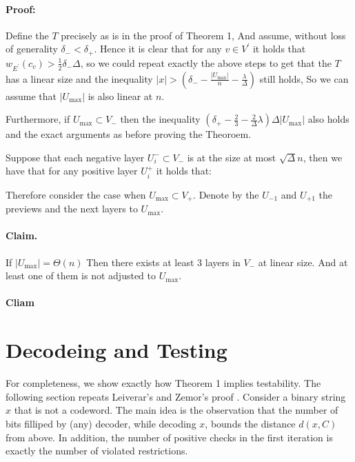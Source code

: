 \documentclass{article}
\begin{document}
\begin{multicols*}{2}
  \paragraph{Proof:} Define the $T$ precisely as is in the proof of Theorem 1, And assume, without loss of generality $\delta_{-} < \delta_{+}$. Hence it is clear that for any $v \in V^\prime$ it holds that $w_{E^\prime}\left( c_{v} \right) > \frac{1}{2}\delta_{-}\Delta$, so we could repeat exactly the above steps to get that the $T$ has a linear size and the inequality $|x| > \left( \delta_{-} - \frac{|U_{\max}|}{n} - \frac{\lambda}{\Delta} \right) $ still holds, So we can assume that $|U_{\max}|$ is also linear at $n$.

  Furthermore, if $U_{\max} \subset V_{-}$ then the inequality $\left( \delta_{+} - \frac{2}{3} - \frac{2}{\Delta}\lambda \right) \Delta |U_{\max}|$ also holds and the exact arguments as before proving the Theoroem.     


  Suppose that each negative layer $U_{i}^{-} \subset V_{-}$ is at the size at most $\sqrt{\Delta}n$, then we have that for any positive layer $U_{i}^{+}$ it holds that:




  Therefore consider the case when $U_{\max} \subset V_{+}$. Denote by the $U_{-1}$ and $U_{+1}$ the previews and the next layers to $U_{\max}$.  
  \paragraph{Claim.} If $ |U_{\max}| = \Theta\left(n  \right)$ Then there exists at least $3$ layers in $V_{-}$ at linear size. And at least one of them is not adjusted to $U_{\max}$.    

  \paragraph{Cliam} 
  \section{Decodeing and Testing}
  For completeness, we show exactly how Theorem 1 implies testability. The following section repeats Leiverar's and Zemor's proof \cite{leverrier2022quantum}. Consider a binary string $x$ that is not a codeword. The main idea is the observation that the number of bits filliped by (any) decoder, while decoding $x$, bounds the distance $d\left( x,C \right)$ from above. In addition, the number of positive checks in the first iteration is exactly the number of violated restrictions.

\end{multicols*}
\end{document}

